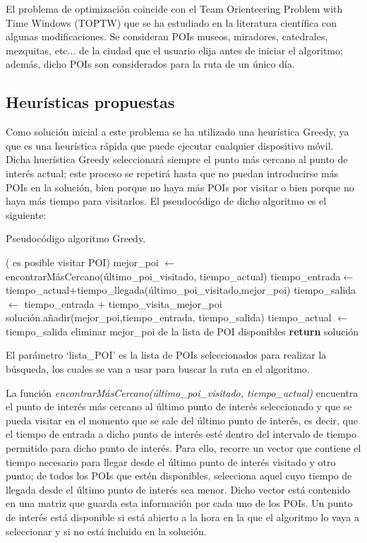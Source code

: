 El problema de optimización coincide con el Team Orienteering Problem with Time Windows (TOPTW) que se ha estudiado en la literatura científica con algunas modificaciones. Se consideran POIs museos, miradores, catedrales, mezquitas, etc... de la ciudad que el usuario elija antes de iniciar el algoritmo; además, dicho POIs son considerados para la ruta de un único día.
\subsection[Heurísticas propuestas]{Heurísticas propuestas}
Como solución inicial a este problema se ha utilizado una heurística Greedy, ya que es una heurística rápida que puede ejecutar cualquier dispositivo móvil. Dicha huerística Greedy seleccionará siempre el punto más cercano al punto de interés actual; este proceso se repetirá hasta que no puedan introducirse más POIs en la solución, bien porque no haya más POIs por visitar o bien porque no haya más tiempo para visitarlos. El pseudocódigo de dicho algoritmo es el siguiente:\newline
\begin{algorithm}[H]
	\caption{Pseudocódigo algoritmo Greedy.}
	\label{alg:greedy_alg}
	\begin{algorithmic}
		\While( es posible visitar POI)
		\State mejor\_poi $\gets$ encontrarMásCercano(último\_poi\_visitado, tiempo\_actual) 
		\State tiempo\_entrada$\gets$tiempo\_actual$+$tiempo\_llegada(último\_poi\_visitado,mejor\_poi)
		\State tiempo\_salida $\gets$ tiempo\_entrada $+$ tiempo\_visita\_mejor\_poi
		\State solución.añadir(mejor\_poi,tiempo\_entrada, tiempo\_salida)
		\State tiempo\_actual $\gets$ tiempo\_salida
		\State eliminar mejor\_poi de la lista de POI disponibles
		\EndWhile
		\State \textbf{return} solución
		\EndFunction
	\end{algorithmic}
\end{algorithm}
\vspace{0.06in}
El parámetro \enquote*{lista\_POI} es la lista de POIs seleccionados para realizar la búsqueda, los cuales se van a usar para buscar la ruta en el algoritmo.\newline

La función \textit{encontrarMásCercano(último\_poi\_visitado, tiempo\_actual)} encuentra el punto de interés más cercano al último punto de interés seleccionado y que se pueda visitar en el momento que se sale del último punto de interés, es decir, que el tiempo de entrada a dicho punto de interés esté dentro del intervalo de tiempo permitido para dicho punto de interés. Para ello, recorre un vector que contiene el tiempo necesario para llegar desde el último punto de interés visitado y otro punto; de todos los POIs que estén disponibles, selecciona aquel cuyo tiempo de llegada desde el último punto de interés sea menor. Dicho vector está contenido en una matriz que guarda esta información por cada uno de los POIs. Un punto de interés está disponible si está abierto a la hora en la que el algoritmo lo vaya a seleccionar y si no está incluido en la solución.\newline

